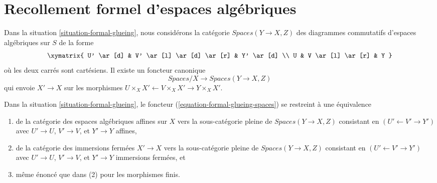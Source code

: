 \section{Recollement formel d'espaces algébriques}
\label{section-formal-glueing-spaces}

\noindent
Dans la situation \ref{situation-formal-glueing}, nous considérons la catégorie
$\textit{Spaces}(Y \to X, Z)$
des diagrammes commutatifs d'espaces algébriques sur $S$ de la forme
$$
\xymatrix{
U' \ar[d] & V' \ar[l] \ar[d] \ar[r] & Y' \ar[d] \\
U & V \ar[l] \ar[r] & Y
}
$$
où les deux carrés sont cartésiens. Il existe un foncteur canonique
\begin{equation}
\label{equation-formal-glueing-spaces}
\textit{Spaces}/X \longrightarrow \textit{Spaces}(Y \to X, Z)
\end{equation}
qui envoie $X' \to X$ sur les morphismes
$U \times_X X' \leftarrow V \times_X X' \rightarrow Y \times_X X'$.

\begin{lemma}
\label{lemma-equivalence-on-affine}
Dans la situation \ref{situation-formal-glueing}, le foncteur
(\ref{equation-formal-glueing-spaces}) se restreint à une
équivalence
\begin{enumerate}
\item de la catégorie des espaces algébriques affines sur $X$
vers la sous-catégorie pleine de $\textit{Spaces}(Y \to X, Z)$ consistant
en $(U' \leftarrow V' \rightarrow Y')$ avec $U' \to U$, $V' \to V$,
et $Y' \to Y$ affines,
\item de la catégorie des immersions fermées $X' \to X$
vers la sous-catégorie pleine de $\textit{Spaces}(Y \to X, Z)$ consistant
en $(U' \leftarrow V' \rightarrow Y')$ avec $U' \to U$, $V' \to V$,
et $Y' \to Y$ immersions fermées, et
\item même énoncé que dans (2) pour les morphismes finis.
\end{enumerate}
\end{lemma}

